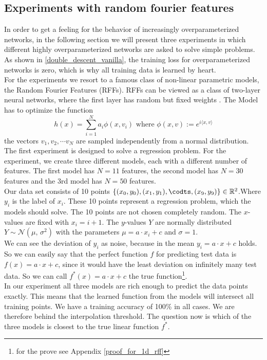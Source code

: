 \subsection{Experiments with random fourier features}
\label{RFF}
In order to get a feeling for the behavior of increasingly overparameterized networks, in the following section we will present three experiments in which different highly overparameterized networks are asked to solve simple problems. As shown in \ref{double_descent_vanilla}, the training loss for overparameterized networks is zero, which is why all training data is learned by heart.\\
For the experiments we resort to a famous class of non-linear parametric models, the Random Fourier Features (RFFs). RFFs can be viewed as a class of two-layer neural networks, where the first layer has random but fixed weights \cite{belkin}. The Model has to optimize the function 
$$
h(x) = \sum_{i = 1}^{N} a_{i}\phi(x,v_i)  \text{ where } \phi(x,v) := e^{i \langle x,v \rangle}
$$
the vectors $v_1,v_2, \cdots v_N$ are sampled independently from a normal distribution. \\
The first experiment is designed to solve a regression problem.
For the experiment, we create three different models, each with a different number of features. The first model has $N = 11$ features, the second model has $N = 30$ features and the 3rd model has $N = 50$ features.  \\
Our data set consists of 10 points $\{(x_0,y_0),(x_1,y_1),\codts ,(x_9,y_9)\} \in \mathbb{R}^2$.Where $y_{i}$ is the label of $x_i$. These 10 points represent a regression problem, which the models should solve. The 10 points are not chosen completely random. The $x$-values are fixed with $x_i = i+1$. The $y$-values $Y$ are normally distributed $Y \sim \mathcal{N}(\mu,\,\sigma^{2})$ with the parameters $\mu = a\cdot x_i +c$ and $\sigma = 1$. \\
We can see the deviation of $y_i$ as noise, because in the mean $y_i = a\cdot x + c$ holds. So we can easily say that the perfect function $f$ for predicting test data is $f(x) = a\cdot x + c$, since it would have the least deviation on infinitely many test data. So we can call $f^*(x) =a\cdot x + c$  the true function\footnote{for the prove see Appendix \ref{proof_for_1d_rff}}. \\
In our experiment all three models are rich enough to predict the data points exactly. This means that the learned function from the models will intersect all training points. We have a training accuracy of 100\% in all cases. We are therefore behind the interpolation threshold. The question now is which of the three models is closest to the true linear function $f^*$.\\
